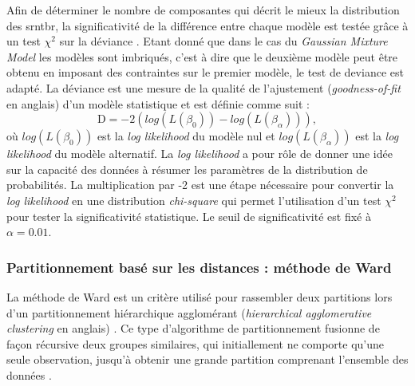 Afin de déterminer le nombre de composantes qui décrit le mieux la distribution des \gls{srntbr}, la significativité de la différence entre chaque 
modèle est testée grâce à un test $\chi^2$ sur la déviance \citep[Chapitre~6]{James2013}. Etant donné que dans le cas du \textit{Gaussian Mixture Model} les modèles
sont imbriqués, c'est à dire que le deuxième modèle peut être obtenu en imposant des contraintes sur le premier modèle, le test de 
deviance est adapté. La déviance est une mesure de la qualité de l'ajustement (\textit{goodness-of-fit} 
en anglais) d'un modèle statistique et est définie comme suit :
\begin{equation}
\label{eq:tbr_deviance}
\text{D} = -2(log(L(\beta_{0})) - log(L(\beta_{\alpha}))),
\end{equation}
où $log(L(\beta_{0}))$ est la \textit{log likelihood} du modèle nul et $log(L(\beta_{\alpha}))$ est la \textit{log likelihood} du modèle alternatif. 
La \textit{log likelihood} a pour rôle de donner une idée sur la capacité des données à résumer les paramètres de la distribution de probabilités. 
La multiplication par -2 est une étape nécessaire pour convertir la \textit{log likelihood} en une distribution \textit{chi-square} qui permet 
l'utilisation d'un test $\chi^2$ pour tester la significativité statistique. Le seuil de significativité est fixé à $\alpha = 0.01$.

\subsubsection{Partitionnement basé sur les distances : méthode de Ward}
La méthode de Ward est un critère utilisé pour rassembler deux partitions lors d'un partitionnement hiérarchique agglomérant (\textit{hierarchical agglomerative clustering} 
en anglais) \citep{Ward1963}. Ce type d'algorithme de partitionnement fusionne de façon récursive deux groupes similaires, qui initiallement ne comporte qu'une seule observation, jusqu'à obtenir une
grande partition comprenant l'ensemble des données \citep[Chapitre~10]{James2013}.

